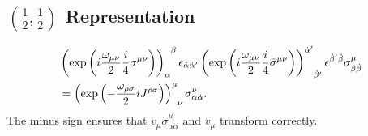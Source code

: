 \subsection{\texorpdfstring{$(\frac{1}{2}, \frac{1}{2})$ Representation}{(1/2,1/2) Representation}}
\begin{align}
    & \tensor{\left(\exp\left(i \frac{\omega_{\mu \nu}}{2} \frac{i}{4} \sigma^{\mu \nu}\right)\right)}{_\alpha^\beta} \epsilon_{\dot\alpha \dot\alpha'} \tensor{\left(\exp\left(i \frac{\omega_{\mu \nu}}{2} \frac{i}{4} \bar\sigma^{\mu \nu}\right)\right)}{^{\dot\alpha'}_{\dot\beta'}} \epsilon^{\dot\beta' \dot\beta} \sigma^\mu_{\beta \dot\beta} \notag \\
    & = \tensor{\left(\exp\left(- \frac{\omega_{\rho \sigma}}{2} i J^{\rho \sigma}\right)\right)}{^\mu_\nu} \sigma^\nu_{\alpha \dot\alpha}. \label{Four-vector representation of the Lorentz transformation}
\end{align}
The minus sign ensures that $v_\mu \sigma^\mu_{\alpha \dot\alpha}$ and $v_\mu$ transform correctly.


